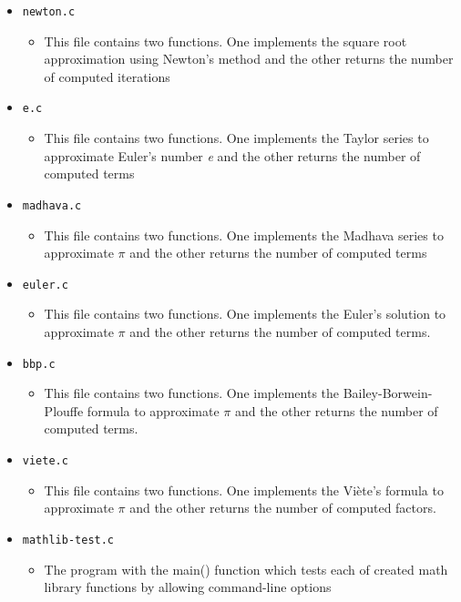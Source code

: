 \documentclass[12pt]{article}
\begin{document}
\begin{itemize}
   \item \texttt{newton.c}
   \begin{itemize}
     \item This file contains two functions. One implements the square root approximation using Newton’s method and the other returns the number of computed iterations
   \end{itemize}
   \item \texttt{e.c}
   \begin{itemize}
     \item This file contains two functions. One implements the Taylor series to approximate Euler’s number \textit{e} and the other returns the number of computed terms
   \end{itemize}
   \item \texttt{madhava.c}
   \begin{itemize}
     \item This file contains two functions. One implements the Madhava series to approximate $\pi$ and the other returns the number of computed terms
   \end{itemize}
   \item \texttt{euler.c}
   \begin{itemize}
     \item This file contains two functions. One implements the Euler’s solution to approximate $\pi$ and the other returns the number of computed terms.
   \end{itemize}
   \item \texttt{bbp.c}
   \begin{itemize}
     \item This file contains two functions. One implements the Bailey-Borwein-Plouffe formula to approximate $\pi$ and the other returns the number of computed terms.
   \end{itemize}
   \item \texttt{viete.c}
   \begin{itemize}
     \item This file contains two functions. One implements the Viète’s formula to approximate $\pi$ and the other returns the number of computed factors.
   \end{itemize}
   \item \texttt{mathlib-test.c}
   \begin{itemize}
     \item The program with the main() function which tests each of created math library functions by allowing command-line options

\end{itemize}
\end{itemize}
\end{document}
